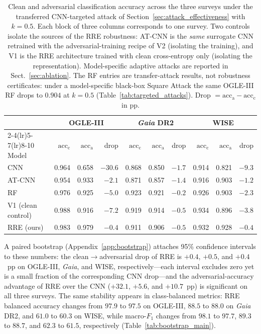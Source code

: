 \documentclass{aa}
\begin{document}
\begin{table}
\centering
\caption{Clean and adversarial classification accuracy across the three
surveys under the transferred CNN-targeted attack of
Section~\ref{sec:attack_effectiveness} with $k = 0.5$. Each block of
three columns corresponds to one survey. Two controls isolate the sources of the RRE
robustness: AT-CNN is the \emph{same} surrogate CNN retrained with the
adversarial-training recipe of V2 (isolating the training), and V1 is the
RRE architecture trained with clean cross-entropy only (isolating the
representation). Model-specific adaptive attacks are reported in
Sect.~\ref{sec:ablation}. The RF entries are transfer-attack results, not
robustness certificates: under a model-specific black-box Square Attack
the same OGLE-III RF drops to $0.904$ at $k=0.5$
(Table~\ref{tab:targeted_attacks}). Drop
$= \mathrm{acc}_{\mathrm{a}} - \mathrm{acc}_{\mathrm{c}}$ in pp.}
\label{tab:main_multisurvey}
\begin{tabular}{lrrrrrrrrr}
\toprule
 & \multicolumn{3}{c}{OGLE-III} & \multicolumn{3}{c}{\textit{Gaia} DR2} & \multicolumn{3}{c}{WISE} \\
\cmidrule(lr){2-4}\cmidrule(lr){5-7}\cmidrule(lr){8-10}
Model & $\mathrm{acc}_{\mathrm{c}}$ & $\mathrm{acc}_{\mathrm{a}}$ & drop & $\mathrm{acc}_{\mathrm{c}}$ & $\mathrm{acc}_{\mathrm{a}}$ & drop & $\mathrm{acc}_{\mathrm{c}}$ & $\mathrm{acc}_{\mathrm{a}}$ & drop \\
\midrule
CNN                  & 0.964 & 0.658 & $-30.6$ & 0.868 & 0.850 & $-1.7$ & 0.914 & 0.821 & $-9.3$ \\
AT-CNN               & 0.954 & 0.933 & $-2.1$  & 0.871 & 0.857 & $-1.4$ & 0.916 & 0.903 & $-1.2$ \\
RF                   & 0.976 & 0.925 & $-5.0$  & 0.923 & 0.921 & $-0.2$ & 0.926 & 0.903 & $-2.3$ \\
V1 (clean control)   & 0.988 & 0.916 & $-7.2$  & 0.919 & 0.914 & $-0.5$ & 0.934 & 0.896 & $-3.8$ \\
RRE (ours)           & 0.983 & 0.979 & $-0.4$  & 0.911 & 0.906 & $-0.5$ & 0.932 & 0.928 & $-0.4$ \\
\bottomrule
\end{tabular}
\end{table}


A paired bootstrap (Appendix~\ref{app:bootstrap}) attaches 95\% confidence intervals to these numbers: the clean$\to$adversarial drop of RRE is $+0.4$, $+0.5$, and $+0.4$~pp on OGLE-III, \textit{Gaia}, and WISE, respectively---each interval excludes zero yet is a small fraction of the corresponding CNN drop---and the adversarial-accuracy advantage of RRE over the CNN ($+32.1$, $+5.6$, and $+10.7$~pp) is significant on all three surveys. The same stability appears in class-balanced metrics: RRE balanced accuracy changes from $97.9$ to $97.5$ on OGLE-III, $88.5$ to $88.0$ on \textit{Gaia} DR2, and $61.0$ to $60.3$ on WISE, while macro-$F_1$ changes from $98.1$ to $97.7$, $89.3$ to $88.7$, and $62.3$ to $61.5$, respectively (Table~\ref{tab:bootstrap_main}).
\end{document}
